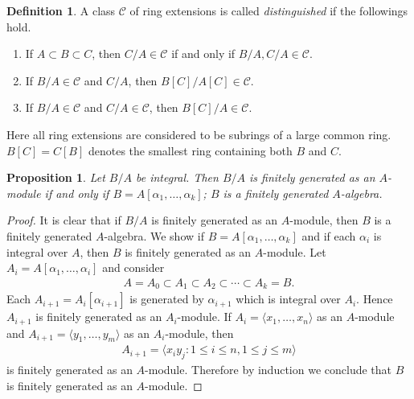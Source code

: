 \documentclass[12pt]{report}
\theoremstyle{plain}
\newtheorem{proposition}[theorem]{Proposition}
\theoremstyle{remark}
\theoremstyle{definition}
\newtheorem{definition}[theorem]{Definition}
\begin{document}
\begin{definition}
    A class $\mathcal{C}$ of ring extensions is called \emph{distinguished} if the followings hold.
    \begin{enumerate}
        \item If $A\subset B\subset C$, then $C/A\in\mathcal{C}$ if and only if $B/A,C/A\in \mathcal{C}$.
        \item If $B/A\in\mathcal{C}$ and $C/A$, then $B[C]/A[C]\in\mathcal{C}$.
        \item If $B/A\in\mathcal{C}$ and $C/A\in\mathcal{C}$, then $B[C]/A\in\mathcal{C}$.
    \end{enumerate}
    Here all ring extensions are considered to be subrings of a large common ring. $B[C]=C[B]$ denotes the smallest ring containing both $B$ and $C$.
\end{definition}

\begin{proposition}
    Let $B/A$ be integral. Then $B/A$ is finitely generated as an $A$-module if and only if $B=A[\alpha_1,\dots,\alpha_k]$; $B$ is a finitely generated $A$-algebra.
\end{proposition}
\begin{proof}
    It is clear that if $B/A$ is finitely generated as an $A$-module, then $B$ is a finitely generated $A$-algebra. We show if $B=A[\alpha_1,\dots,\alpha_k]$ and if each $\alpha_i$ is integral over $A$, then $B$ is finitely generated as an $A$-module. Let $A_i=A[\alpha_1,\dots,\alpha_i]$ and consider
    \begin{align*}
        A=A_0\subset A_1\subset A_2\subset\cdots\subset A_k=B.
    \end{align*}
    Each $A_{i+1}=A_i[\alpha_{i+1}]$ is generated by $\alpha_{i+1}$ which is integral over $A_i$. Hence $A_{i+1}$ is finitely generated as an $A_i$-module. If $A_i=\langle x_1,\dots,x_n\rangle$ as an $A$-module and $A_{i+1}=\langle y_1,\dots,y_m\rangle$ as an $A_i$-module, then
    \begin{align*}
        A_{i+1}=\langle x_iy_j:1\le i\le n,1\le j\le m\rangle
    \end{align*}
    is finitely generated as an $A$-module. Therefore by induction we conclude that $B$ is finitely generated as an $A$-module.
\end{proof}
\end{document}
